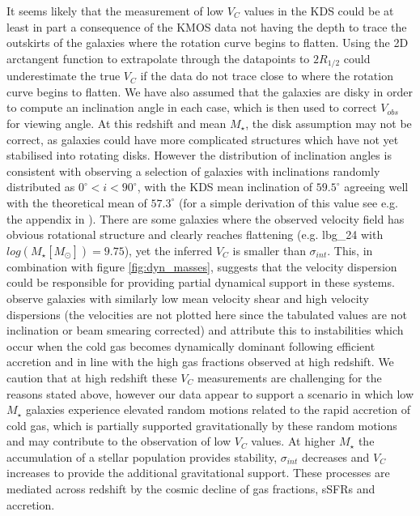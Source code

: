 \documentclass[fleqn,usenatbib]{mn2e}
\begin{document}
It seems likely that the measurement of low $V_{C}$ values in the KDS could be at least in part a consequence of the KMOS data not having the depth to trace the outskirts of the galaxies where the rotation curve begins to flatten.
Using the 2D arctangent function to extrapolate through the datapoints to $2R_{1/2}$ could underestimate the true $V_{C}$ if the data do not trace close to where the rotation curve begins to flatten.
We have also assumed that the galaxies are disky in order to compute an inclination angle in each case, which is then used to correct $V_{obs}$ for viewing angle.
At this redshift and mean $M_{\star}$, the disk assumption may not be correct, as galaxies could have more complicated structures which have not yet stabilised into rotating disks.
However the distribution of inclination angles is consistent with observing a selection of galaxies with inclinations randomly distributed as $0^{\circ} < i < 90^{\circ}$, with the KDS mean inclination of $59.5^{\circ}$ agreeing well with the theoretical mean of $57.3^{\circ}$ (for a simple derivation of this value see e.g. the appendix in \cite{Law2009}).
There are some galaxies where the observed velocity field has obvious rotational structure and clearly reaches flattening (e.g. lbg\_24 with $log(M_{\star}[M_{\odot}])=9.75$), yet the inferred $V_{C}$ is smaller than $\sigma_{int}$.
This, in combination with figure \ref{fig:dyn_masses}, suggests that the velocity dispersion could be responsible for providing partial dynamical support in these systems.
\cite{Law2009} observe galaxies with similarly low mean velocity shear and high velocity dispersions (the velocities are not plotted here since the tabulated values are not inclination or beam smearing corrected) and attribute this to instabilities which occur when the cold gas becomes dynamically dominant following efficient accretion and in line with the high gas fractions observed at high redshift. 
We caution that at high redshift these $V_{C}$ measurements are challenging for the reasons stated above, however our data appear to support a scenario in which low $M_{\star}$ galaxies experience elevated random motions related to the rapid accretion of cold gas, which is partially supported gravitationally by these random motions and may contribute to the observation of low $V_{C}$ values.
At higher $M_{\star}$ the accumulation of a stellar population provides stability, $\sigma_{int}$ decreases and $V_{C}$ increases to provide the additional gravitational support.
These processes are mediated across redshift by the cosmic decline of gas fractions, sSFRs and accretion. 
\end{document}
